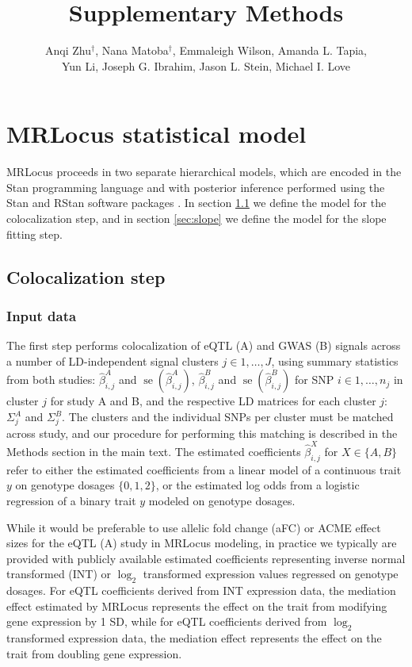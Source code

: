 \documentclass[11pt]{article}
\title{Supplementary Methods}
\author{Anqi Zhu$^\dagger$, Nana Matoba$^\dagger$, Emmaleigh Wilson, Amanda L. Tapia,
  \\ Yun Li, Joseph G. Ibrahim, Jason L. Stein, Michael I. Love}
\DeclareMathOperator{\se}{\textrm{se}}
\begin{document}
\maketitle
\section{MRLocus statistical model}

MRLocus proceeds in two separate hierarchical models, which are
encoded in the Stan programming language and with posterior
inference performed using the Stan and RStan software packages
\citep{stan,rstan}. In section \ref{sec:coloc} we define the
model for the colocalization step, and in section \ref{sec:slope} we
define the model for the slope fitting step.

\subsection{Colocalization step} \label{sec:coloc}

\subsubsection{Input data}

The first step performs colocalization of eQTL (A) and GWAS (B)
signals across a number of LD-independent signal clusters
$j \in 1,\dots,J$, using summary statistics from both studies:
$\widehat{\beta}^A_{i,j}$ and $\se(\widehat{\beta}^A_{i,j})$,
$\widehat{\beta}^B_{i,j}$ and $\se(\widehat{\beta}^B_{i,j})$
for SNP $i \in 1,\dots,n_j$ in cluster $j$ for study A and B,
and the respective LD matrices for each cluster $j$:
$\Sigma_j^A$ and $\Sigma_j^B$.
The clusters and the individual SNPs per cluster must be matched across
study, and our procedure for performing this matching is described in
the Methods section in the main text.
The estimated coefficients $\widehat{\beta}^X_{i,j}$ for
$X \in \{A,B\}$ refer to either the estimated coefficients from a
linear model of a continuous trait $y$ on genotype dosages
$\{0,1,2\}$, or the estimated log odds from a logistic regression of a
binary trait $y$ modeled on genotype dosages.

While it would be preferable to use allelic fold change (aFC)
\citep{aFC} or ACME effect sizes \citep{ACME} for the eQTL (A) study
in MRLocus modeling, in practice we typically are provided with
publicly available estimated coefficients representing inverse normal
transformed (INT) or $\log_2$ transformed expression values regressed
on genotype dosages. For eQTL coefficients derived from INT expression
data, the mediation effect estimated by MRLocus represents the effect
on the trait from modifying gene expression by 1 SD, while for eQTL
coefficients derived from $\log_2$ transformed expression data, the
mediation effect represents the effect on the trait from doubling gene
expression.
\end{document}

